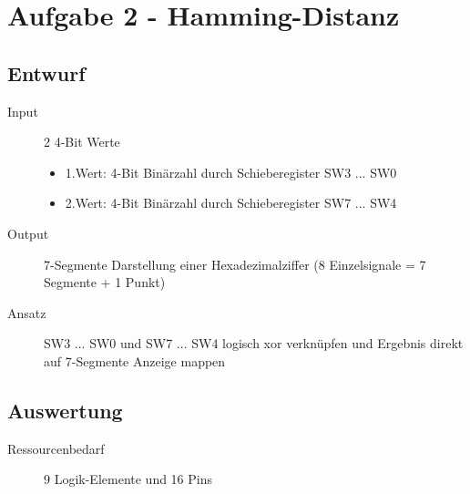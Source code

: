 \section{Aufgabe 2 - Hamming-Distanz}
\subsection{Entwurf}
\begin{description}
	\item[Input] 2 4-Bit Werte 
		\begin{itemize}
			\item 1.Wert: 4-Bit Binärzahl durch Schieberegister SW3 ... SW0
			\item 2.Wert: 4-Bit Binärzahl durch Schieberegister SW7 ... SW4
		\end{itemize}
	\item[Output] 7-Segmente Darstellung einer Hexadezimalziffer (8 Einzelsignale = 7 Segmente + 1 Punkt)
	\item[Ansatz] SW3 ... SW0 und SW7 ... SW4 logisch xor verknüpfen und Ergebnis direkt auf 7-Segmente Anzeige mappen
\end{description}	


\subsection{Auswertung}
\begin{description}
\item[Ressourcenbedarf] 9 Logik-Elemente und 16 Pins
\end{description}
